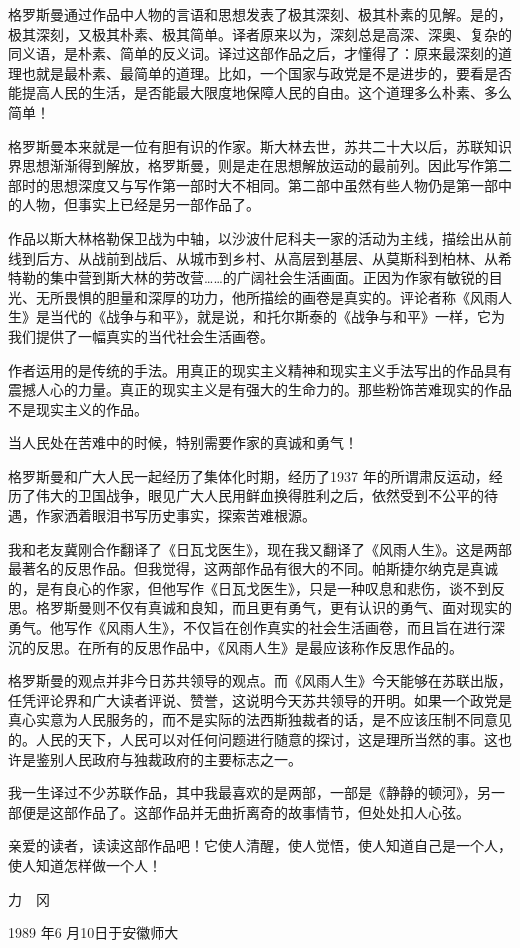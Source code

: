 格罗斯曼通过作品中人物的言语和思想发表了极其深刻、极其朴素的见解。是的，极其深刻，又极其朴素、极其简单。译者原来以为，深刻总是高深、深奥、复杂的同义语，是朴素、简单的反义词。译过这部作品之后，才懂得了：原来最深刻的道理也就是最朴素、最简单的道理。比如，一个国家与政党是不是进步的，要看是否能提高人民的生活，是否能最大限度地保障人民的自由。这个道理多么朴素、多么简单！

格罗斯曼本来就是一位有胆有识的作家。斯大林去世，苏共二十大以后，苏联知识界思想渐渐得到解放，格罗斯曼，则是走在思想解放运动的最前列。因此写作第二部时的思想深度又与写作第一部时大不相同。第二部中虽然有些人物仍是第一部中的人物，但事实上已经是另一部作品了。

作品以斯大林格勒保卫战为中轴，以沙波什尼科夫一家的活动为主线，描绘出从前线到后方、从战前到战后、从城市到乡村、从高层到基层、从莫斯科到柏林、从希特勒的集中营到斯大林的劳改营……的广阔社会生活画面。正因为作家有敏锐的目光、无所畏惧的胆量和深厚的功力，他所描绘的画卷是真实的。评论者称《风雨人生》是当代的《战争与和平》，就是说，和托尔斯泰的《战争与和平》一样，它为我们提供了一幅真实的当代社会生活画卷。

作者运用的是传统的手法。用真正的现实主义精神和现实主义手法写出的作品具有震撼人心的力量。真正的现实主义是有强大的生命力的。那些粉饰苦难现实的作品不是现实主义的作品。

当人民处在苦难中的时候，特别需要作家的真诚和勇气！

格罗斯曼和广大人民一起经历了集体化时期，经历了1937 年的所谓肃反运动，经历了伟大的卫国战争，眼见广大人民用鲜血换得胜利之后，依然受到不公平的待遇，作家洒着眼泪书写历史事实，探索苦难根源。

我和老友冀刚合作翻译了《日瓦戈医生》，现在我又翻译了《风雨人生》。这是两部最著名的反思作品。但我觉得，这两部作品有很大的不同。帕斯捷尔纳克是真诚的，是有良心的作家，但他写作《日瓦戈医生》，只是一种叹息和悲伤，谈不到反思。格罗斯曼则不仅有真诚和良知，而且更有勇气，更有认识的勇气、面对现实的勇气。他写作《风雨人生》，不仅旨在创作真实的社会生活画卷，而且旨在进行深沉的反思。在所有的反思作品中，《风雨人生》是最应该称作反思作品的。

格罗斯曼的观点并非今日苏共领导的观点。而《风雨人生》今天能够在苏联出版，任凭评论界和广大读者评说、赞誉，这说明今天苏共领导的开明。如果一个政党是真心实意为人民服务的，而不是实际的法西斯独裁者的话，是不应该压制不同意见的。人民的天下，人民可以对任何问题进行随意的探讨，这是理所当然的事。这也许是鉴别人民政府与独裁政府的主要标志之一。

我一生译过不少苏联作品，其中我最喜欢的是两部，一部是《静静的顿河》，另一部便是这部作品了。这部作品并无曲折离奇的故事情节，但处处扣人心弦。

亲爱的读者，读读这部作品吧！它使人清醒，使人觉悟，使人知道自己是一个人，使人知道怎样做一个人！

力　冈

1989 年6 月10日于安徽师大